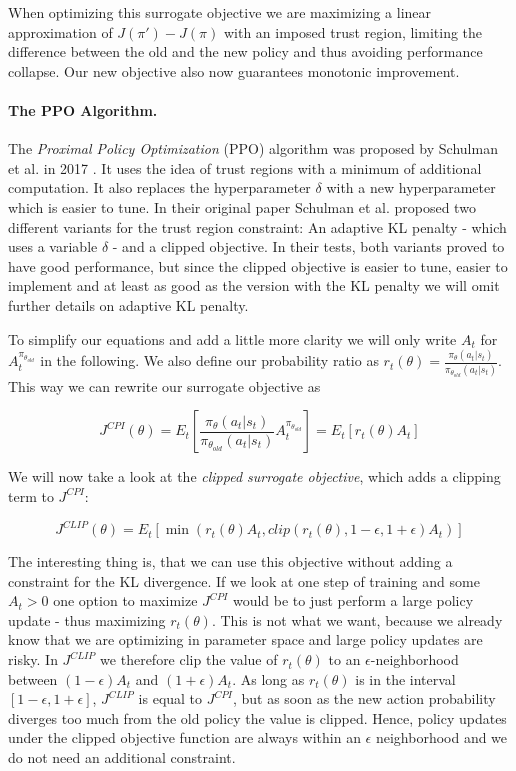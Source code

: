 When optimizing this surrogate objective we are maximizing a linear approximation of $J(\pi') - J(\pi)$ with an imposed trust region, limiting the difference between the old and the new policy and thus avoiding performance collapse. Our new objective also now guarantees monotonic improvement.

\paragraph{The PPO Algorithm.}
The \textit{Proximal Policy Optimization} (PPO) algorithm was proposed by Schulman et al. in 2017 \cite{schulman2017proximal}. It uses the idea of trust regions with a minimum of additional computation. It also replaces the hyperparameter $\delta$ with a new hyperparameter which is easier to tune. In their original paper Schulman et al. proposed two different variants for the trust region constraint: An adaptive KL penalty - which uses a variable $\delta$ - and a clipped objective. In their tests, both variants proved to have good performance, but since the clipped objective is easier to tune, easier to implement and at least as good as the version with the KL penalty we will omit further details on adaptive KL penalty. 

To simplify our equations and add a little more clarity we will only write $A_t$ for $A_t^{\pi_{\theta_{old}}}$ in the following. We also define our probability ratio as $r_t(\theta) = \frac{\pi_\theta(a_t|s_t)}{\pi_{\theta_{old}}(a_t|s_t)}$. This way we can rewrite our surrogate objective as

  \[J^{CPI}(\theta) = E_t\left[\frac{\pi_\theta(a_t|s_t)}{\pi_{\theta_{old}}(a_t|s_t)}A_t^{\pi_{\theta_{old}}}\right] = E_t[r_t(\theta)A_t]\]

We will now take a look at the \textit{clipped surrogate objective}, which adds a clipping term to $J^{CPI}$:

\[J^{CLIP}(\theta) = E_t[\min(r_t(\theta)A_t, clip(r_t(\theta), 1-\epsilon, 1+\epsilon)A_t)]\]

The interesting thing is, that we can use this objective without adding a constraint for the KL divergence. If we look at one step of training and some $A_t > 0$ one option to maximize $J^{CPI}$ would be to just perform a large policy update - thus maximizing $r_t(\theta)$. This is not what we want, because we already know that we are optimizing in parameter space and large policy updates are risky. In $J^{CLIP}$ we therefore clip the value of $r_t(\theta)$ to an $\epsilon$-neighborhood between $(1-\epsilon)A_t$ and $(1+\epsilon)A_t$. As long as $r_t(\theta)$ is in the interval $[1-\epsilon, 1+\epsilon]$, $J^{CLIP}$ is equal to $J^{CPI}$, but as soon as the new action probability diverges too much from the old policy the value is clipped. Hence, policy updates under the clipped objective function are always within an $\epsilon$ neighborhood and we do not need an additional constraint.

